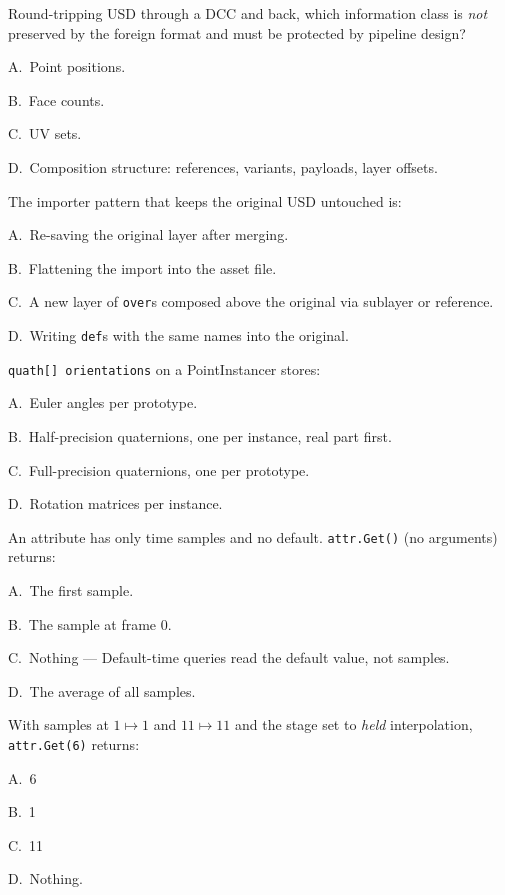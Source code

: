 Round-tripping USD through a DCC and back, which information class is
\emph{not} preserved by the foreign format and must be protected by
pipeline design?
\begin{Choices}
  \item A.\ Point positions.
  \item B.\ Face counts.
  \item C.\ UV sets.
  \item D.\ Composition structure: references, variants, payloads, layer offsets.
\end{Choices}

The importer pattern that keeps the original USD untouched is:
\begin{Choices}
  \item A.\ Re-saving the original layer after merging.
  \item B.\ Flattening the import into the asset file.
  \item C.\ A new layer of \texttt{over}s composed above the original via sublayer or reference.
  \item D.\ Writing \texttt{def}s with the same names into the original.
\end{Choices}

\texttt{quath[] orientations} on a PointInstancer stores:
\begin{Choices}
  \item A.\ Euler angles per prototype.
  \item B.\ Half-precision quaternions, one per instance, real part first.
  \item C.\ Full-precision quaternions, one per prototype.
  \item D.\ Rotation matrices per instance.
\end{Choices}

An attribute has only time samples and no default. \texttt{attr.Get()}
(no arguments) returns:
\begin{Choices}
  \item A.\ The first sample.
  \item B.\ The sample at frame 0.
  \item C.\ Nothing --- Default-time queries read the default value, not samples.
  \item D.\ The average of all samples.
\end{Choices}

With samples at $1 \mapsto 1$ and $11 \mapsto 11$ and the stage set to
\emph{held} interpolation, \texttt{attr.Get(6)} returns:
\begin{Choices}
  \item A.\ 6
  \item B.\ 1
  \item C.\ 11
  \item D.\ Nothing.
\end{Choices}

